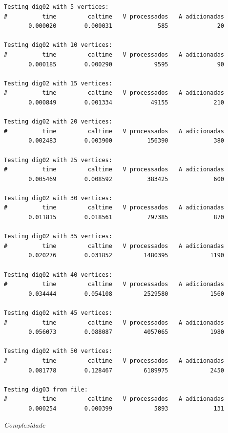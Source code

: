 \documentclass[code,math]{relatorio-deti}
\begin{document}
\begin{listing}[H]
	\centering
	\begin{verbatim}
Testing dig02 with 5 vertices:
#          time         caltime   V processados   A adicionadas
       0.000020        0.000031             585              20

Testing dig02 with 10 vertices:
#          time         caltime   V processados   A adicionadas
       0.000185        0.000290            9595              90

Testing dig02 with 15 vertices:
#          time         caltime   V processados   A adicionadas
       0.000849        0.001334           49155             210

Testing dig02 with 20 vertices:
#          time         caltime   V processados   A adicionadas
       0.002483        0.003900          156390             380

Testing dig02 with 25 vertices:
#          time         caltime   V processados   A adicionadas
       0.005469        0.008592          383425             600

Testing dig02 with 30 vertices:
#          time         caltime   V processados   A adicionadas
       0.011815        0.018561          797385             870

Testing dig02 with 35 vertices:
#          time         caltime   V processados   A adicionadas
       0.020276        0.031852         1480395            1190

Testing dig02 with 40 vertices:
#          time         caltime   V processados   A adicionadas
       0.034444        0.054108         2529580            1560

Testing dig02 with 45 vertices:
#          time         caltime   V processados   A adicionadas
       0.056073        0.088087         4057065            1980

Testing dig02 with 50 vertices:
#          time         caltime   V processados   A adicionadas
       0.081778        0.128467         6189975            2450

Testing dig03 from file:
#          time         caltime   V processados   A adicionadas
       0.000254        0.000399            5893             131
    \end{verbatim}
	\caption{\textit{{Complexidade}}}
	\label{}
\end{listing}
\end{document}
